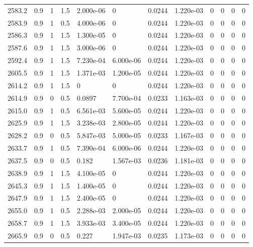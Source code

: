 \documentclass[preview]{standalone}
\begin{document}
{{{{{{{{{{{{{{{\begin{tabular}{L{1.2cm}C{1.2cm} C{0.3cm}C{0.5cm} C{1.4cm}C{1.4cm} C{1.4cm}C{1.4cm} C{1.6cm}C{1.6cm} C{1.6cm}C{1.6cm}}
  2583.2  &   0.9  & 1     & 1.5 &  2.000e-06  & 0  &  0.0244&   1.220e-03& 0 & 0   &  0 & 0  \\ 
  2583.9  &   0.9  & 1     & 0.5 &  4.000e-06  & 0  &  0.0244&   1.220e-03& 0 & 0   &  0 & 0  \\ 
  2586.3  &   0.9  & 1     & 1.5 &  1.300e-05  & 0  &  0.0244&   1.220e-03& 0 & 0   &  0 & 0  \\ 
  2587.6  &   0.9  & 1     & 1.5 &  3.000e-06  & 0  &  0.0244&   1.220e-03& 0 & 0   &  0 & 0  \\ 
  2592.4  &   0.9  & 1     & 1.5 &  7.230e-04  & 6.000e-06  &  0.0244&   1.220e-03& 0 & 0   &  0 & 0  \\ 
  2605.5  &   0.9  & 1     & 1.5 &  1.371e-03  & 1.200e-05  &  0.0244&   1.220e-03& 0 & 0   &  0 & 0  \\ 
  2614.2  &   0.9  & 1     & 1.5 &  0  & 0  &  0.0244&   1.220e-03& 0 & 0   &  0 & 0  \\ 
  2614.9  &   0.9  & 0     & 0.5 &  0.0897  & 7.700e-04  &  0.0233&   1.163e-03& 0 & 0   &  0 & 0  \\ 
  2615.0  &   0.9  & 1     & 0.5 &  6.561e-03  & 5.600e-05  &  0.0244&   1.220e-03& 0 & 0   &  0 & 0  \\ 
  2625.9  &   0.9  & 1     & 1.5 &  3.238e-03  & 2.800e-05  &  0.0244&   1.220e-03& 0 & 0   &  0 & 0  \\ 
  2628.2  &   0.9  & 0     & 0.5 &  5.847e-03  & 5.000e-05  &  0.0233&   1.167e-03& 0 & 0   &  0 & 0  \\ 
  2633.7  &   0.9  & 1     & 0.5 &  7.390e-04  & 6.000e-06  &  0.0244&   1.220e-03& 0 & 0   &  0 & 0  \\ 
  2637.5  &   0.9  & 0     & 0.5 &  0.182  & 1.567e-03  &  0.0236&   1.181e-03& 0 & 0   &  0 & 0  \\ 
  2638.9  &   0.9  & 1     & 1.5 &  4.100e-05  & 0  &  0.0244&   1.220e-03& 0 & 0   &  0 & 0  \\ 
  2645.3  &   0.9  & 1     & 1.5 &  1.400e-05  & 0  &  0.0244&   1.220e-03& 0 & 0   &  0 & 0  \\ 
  2647.9  &   0.9  & 1     & 1.5 &  2.400e-05  & 0  &  0.0244&   1.220e-03& 0 & 0   &  0 & 0  \\ 
  2655.0  &   0.9  & 1     & 0.5 &  2.288e-03  & 2.000e-05  &  0.0244&   1.220e-03& 0 & 0   &  0 & 0  \\ 
  2658.7  &   0.9  & 1     & 1.5 &  3.933e-03  & 3.400e-05  &  0.0244&   1.220e-03& 0 & 0   &  0 & 0  \\ 
  2665.9  &   0.9  & 0     & 0.5 &  0.227  & 1.947e-03  &  0.0235&   1.173e-03& 0 & 0   &  0 & 0  \\ 

\end{tabular}}}}}}}}}}}}}}}}
\end{document}
